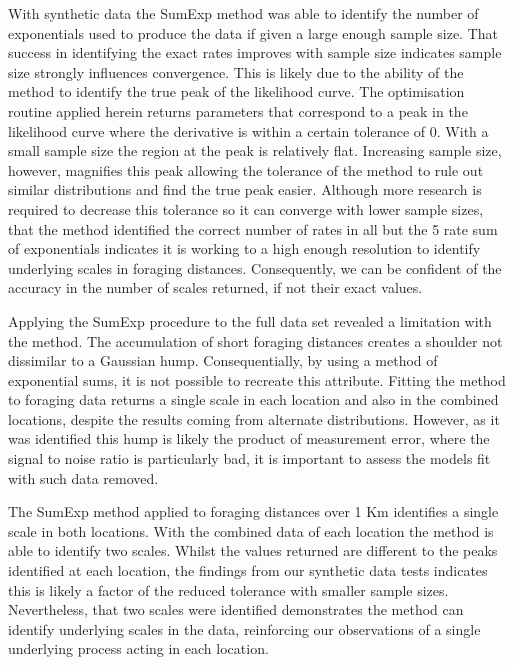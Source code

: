 \documentclass[11pt,usenames,dvipsnames,a4paper]{article}
\begin{document}
\begin{linenumbers}
With synthetic data the SumExp method was able to identify the number of exponentials used to produce the data if given a large enough sample size. That success in identifying the exact rates improves with sample size indicates sample size strongly influences convergence. This is likely due to the ability of the method to identify the true peak of the likelihood curve. The optimisation routine applied herein returns parameters that correspond to a peak in the likelihood curve where the derivative is within a certain tolerance of 0. With a small sample size the region at the peak is relatively flat. Increasing sample size, however, magnifies this peak allowing the tolerance of the method to rule out similar distributions and find the true peak easier. Although more research is required to decrease this tolerance so it can converge with lower sample sizes, that the method identified the correct number of rates in all but the 5 rate sum of exponentials indicates it is working to a high enough resolution to identify underlying scales in foraging distances. Consequently, we can be confident of the accuracy in the number of scales returned, if not their exact values. 

Applying the SumExp procedure to the full data set revealed a limitation with the method. The accumulation of short foraging distances creates a shoulder not dissimilar to a Gaussian hump. Consequentially, by using a method of exponential sums, it is not possible to recreate this attribute. Fitting the method to foraging data returns a single scale in each location and also in the combined locations, despite the results coming from alternate distributions. However, as it was identified this hump is likely the product of measurement error, where the signal to noise ratio is particularly bad, it is important to assess the models fit with such data removed.

The SumExp method applied to foraging distances over 1 Km identifies a single scale in both locations. With the combined data of each location the method is able to identify two scales. Whilst the values returned are different to the peaks identified at each location, the findings from our synthetic data tests indicates this is likely a factor of the reduced tolerance with smaller sample sizes. Nevertheless, that two scales were identified demonstrates the method can identify underlying scales in the data, reinforcing our observations of a single underlying process acting in each location. 


\end{linenumbers}
\end{document}
